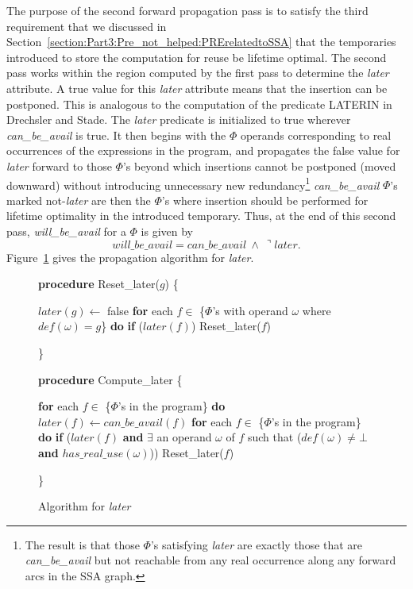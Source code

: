 The purpose of the second forward propagation pass is to 
satisfy the third requirement that we discussed in 
Section~\ref{section:Part3:Pre_not_helped:PRErelatedtoSSA}
that the temporaries introduced to store the computation for reuse be 
lifetime optimal. The second pass works within the region computed by the
first pass to determine the \emph{later} attribute. 
A true value for this \emph{later} attribute means that the insertion
can be postponed.  This
is analogous to the computation of the predicate LATERIN
in Drechsler and Stade\cite{DS93}.  The \emph{later}
predicate is initialized to true wherever \emph{can\_be\_avail} is
true.  It then begins with the $\Phi$ operands corresponding to real
occurrences of the expressions in the program, and propagates the false value
for \emph{later} forward to those $\Phi$'s beyond which insertions cannot be
postponed (moved downward) without introducing unnecessary new 
redundancy\footnote{The result is that those $\Phi$'s satisfying \emph{later}
are exactly those that are \emph{can\_be\_avail} but not reachable from
any real occurrence along any forward arcs in the SSA graph.}
\emph{can\_be\_avail} $\Phi$'s marked not-\emph{later} are then the $\Phi$'s
where insertion should be performed for lifetime optimality in the introduced
temporary.   Thus, at the end of this second pass, \emph{will\_be\_avail}
for a $\Phi$ is given by $$will\_be\_avail = can\_be\_avail\ \wedge\ \urcorner later.$$
Figure~\ref{fig: later} gives the propagation algorithm for \emph{later}.

\begin{figure}[!ht]
{\bf procedure} Reset\_later($g$) 
\{
\begin{code}
 $later(g) \leftarrow$ false
 {\bf for} each $f \in$ \{$\Phi$'s with operand $\omega$ where $def(\omega) = g$\} {\bf do}
   {\bf if} ($later(f)$)
       Reset\_later($f$)
\end{code}
\}

{\bf procedure} Compute\_later
\{
\begin{code}
 {\bf for} each $f \in$ \{$\Phi$'s in the program\} {\bf do}
   $later(f) \leftarrow can\_be\_avail(f)$
 {\bf for} each $f \in$ \{$\Phi$'s in the program\} {\bf do}
   {\bf if} ($later(f)$ {\bf and}
       $\exists$ an operand $\omega$ of $f$ such that ($def(\omega) \neq \bot$ {\bf and} $has\_real\_use(\omega)$))
	Reset\_later($f$)
\end{code}
\}
\caption{Algorithm for \emph{later}}
\label{fig: later}
\end{figure}

